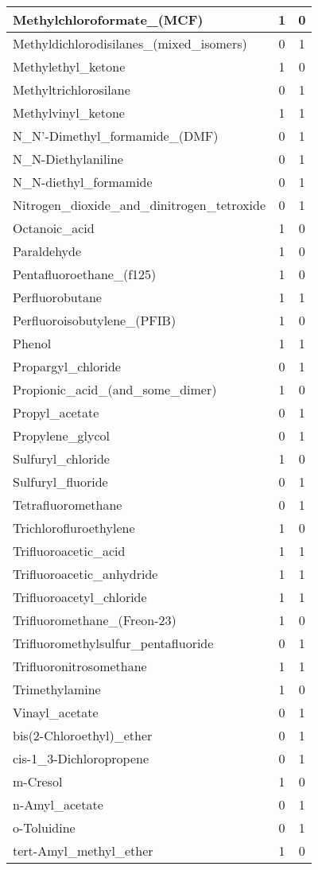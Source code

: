 \begin{longtable}{|l|c|c|}
Methylchloroformate\_(MCF) &1 &0\\ \hline
Methyldichlorodisilanes\_(mixed\_isomers) &0 &1\\ \hline
Methylethyl\_ketone &1 &0\\ \hline
Methyltrichlorosilane &0 &1\\ \hline
Methylvinyl\_ketone &1 &1\\ \hline
N\_N'-Dimethyl\_formamide\_(DMF) &0 &1\\ \hline
N\_N-Diethylaniline &0 &1\\ \hline
N\_N-diethyl\_formamide &0 &1\\ \hline
Nitrogen\_dioxide\_and\_dinitrogen\_tetroxide &0 &1\\ \hline
Octanoic\_acid &1 &0\\ \hline
Paraldehyde &1 &0\\ \hline
Pentafluoroethane\_(f125) &1 &0\\ \hline
Perfluorobutane &1 &1\\ \hline
Perfluoroisobutylene\_(PFIB) &1 &0\\ \hline
Phenol &1 &1\\ \hline
Propargyl\_chloride &0 &1\\ \hline
Propionic\_acid\_(and\_some\_dimer) &1 &0\\ \hline
Propyl\_acetate &0 &1\\ \hline
Propylene\_glycol &0 &1\\ \hline
Sulfuryl\_chloride &1 &0\\ \hline
Sulfuryl\_fluoride &0 &1\\ \hline
Tetrafluoromethane &0 &1\\ \hline
Trichlorofluroethylene &1 &0\\ \hline
Trifluoroacetic\_acid &1 &1\\ \hline
Trifluoroacetic\_anhydride &1 &1\\ \hline
Trifluoroacetyl\_chloride &1 &1\\ \hline
Trifluoromethane\_(Freon-23) &1 &0\\ \hline
Trifluoromethylsulfur\_pentafluoride &0 &1\\ \hline
Trifluoronitrosomethane &1 &1\\ \hline
Trimethylamine &1 &0\\ \hline
Vinayl\_acetate &0 &1\\ \hline
bis(2-Chloroethyl)\_ether &0 &1\\ \hline
cis-1\_3-Dichloropropene &0 &1\\ \hline
m-Cresol &1 &0\\ \hline
n-Amyl\_acetate &0 &1\\ \hline
o-Toluidine &0 &1\\ \hline
tert-Amyl\_methyl\_ether &1 &0\\ \hline
\bottomrule
\end{longtable}
